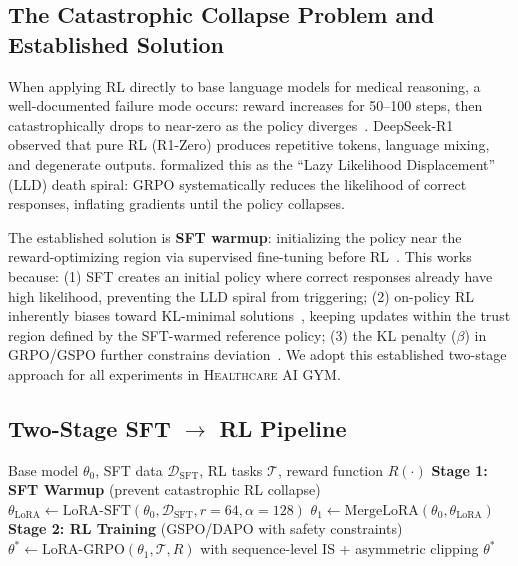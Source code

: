 \documentclass{article}
\newcommand{\gym}{\textsc{Healthcare AI GYM}}
\begin{document}
\subsection{The Catastrophic Collapse Problem and Established Solution}
\label{sec:b041}

When applying RL directly to base language models for medical reasoning, a well-documented failure mode occurs: reward increases for 50--100 steps, then catastrophically drops to near-zero as the policy diverges~\citep{deng2025lld, dapo2025}. DeepSeek-R1~\citep{deepseekr1} observed that pure RL (R1-Zero) produces repetitive tokens, language mixing, and degenerate outputs. \citet{deng2025lld} formalized this as the ``Lazy Likelihood Displacement'' (LLD) death spiral: GRPO systematically reduces the likelihood of correct responses, inflating gradients until the policy collapses.

The established solution is \textbf{SFT warmup}: initializing the policy near the reward-optimizing region via supervised fine-tuning before RL~\citep{deepseekr1, medagentgym2026, gur2025webrl}. This works because: (1) SFT creates an initial policy where correct responses already have high likelihood, preventing the LLD spiral from triggering; (2) on-policy RL inherently biases toward KL-minimal solutions~\citep{rlrazor2025}, keeping updates within the trust region defined by the SFT-warmed reference policy; (3) the KL penalty ($\beta$) in GRPO/GSPO further constrains deviation~\citep{korbak2022forgetting}. We adopt this established two-stage approach for all experiments in \gym{}.

\subsection{Two-Stage SFT $\to$ RL Pipeline}

\begin{algorithm}[t]
\caption{Two-Stage Anti-Collapse Training Pipeline}
\label{alg:pipeline}
\begin{algorithmic}[1]
\REQUIRE Base model $\theta_0$, SFT data $\mathcal{D}_{\text{SFT}}$, RL tasks $\mathcal{T}$, reward function $R(\cdot)$
\STATE \textbf{Stage 1: SFT Warmup} (prevent catastrophic RL collapse)
\STATE \quad $\theta_{\text{LoRA}} \leftarrow \text{LoRA-SFT}(\theta_0, \mathcal{D}_{\text{SFT}}, r{=}64, \alpha{=}128)$
\STATE \quad $\theta_1 \leftarrow \text{MergeLoRA}(\theta_0, \theta_{\text{LoRA}})$ 
\STATE \textbf{Stage 2: RL Training} (GSPO/DAPO with safety constraints)
\STATE \quad $\theta^* \leftarrow \text{LoRA-GRPO}(\theta_1, \mathcal{T}, R)$ with sequence-level IS + asymmetric clipping
\RETURN $\theta^*$
\end{algorithmic}
\end{algorithm}
\end{document}
